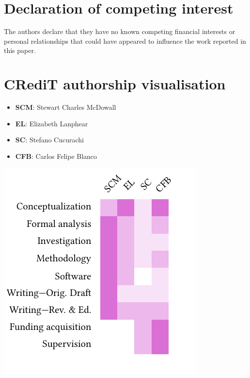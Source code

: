 \documentclass[a4paper,fleqn]{cas-dc}
\begin{document}
\section*{Declaration of competing interest}
The authors declare that they have no known competing financial interests or personal relationships that could have appeared to influence the work reported in this paper.


\section*{CRediT authorship visualisation} %

\begin{itemize}
	\item \textbf{SCM}: Stewart Charles McDowall
	\item \textbf{EL}: Elizabeth Lanphear
	\item \textbf{SC}: Stefano Cucurachi
	\item \textbf{CFB}: Carlos Felipe Blanco
\end{itemize}

\includegraphics[width=0.8\columnwidth]{figures/T-reX_credit_heatmap.pdf}
\end{document}
